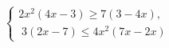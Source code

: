 \begin{ex}[type=ineq_system]
	\begin{condition}
		$\begin{cases} 2x^2(4x - 3)\geqslant7(3 - 4x),\\
			\;3(2x - 7)\leqslant4x^2(7x - 2x)
		\end{cases}$
	\end{condition}
	\answer{$ [0,75;3,5] $}
\end{ex}